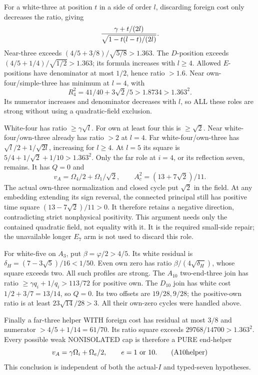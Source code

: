 \documentclass[11pt]{article}
\begin{document}
For a white-three at position \(t\) in a
side of order \(l\), discarding foreign
cost only decreases the ratio, giving
\[
                  {\gamma+t/(2l)\over
                            \sqrt{1-t(l-t)/(2l)}} .
\]
Near-three exceeds
\((4/5+3/8)/\sqrt{5/8}>1.363\).
The \(D\)-position exceeds
\((4/5+1/4)/\sqrt{1/2}>1.363\);
its formula increases with \(l\ge4\).
Allowed \(E\)-positions have denominator
at most \(1/2\), hence ratio \(>1.6\).
Near own-four/simple-three has minimum
at \(l=4\), with
\[
                     R_4^2=41/40+3\sqrt2/5
                             >1.8734>1.363^2 .
\]
Its numerator increases and denominator
decreases with \(l\), so ALL these roles
are strong without using a quadratic-field
exclusion.

White-four has ratio \(\ge\gamma\sqrt l\).
For own at least four this is \(\ge\sqrt2\).
Near white-four/own-three already has
ratio \(>2\) at \(l=4\).
Far white-four/own-three has
\(\sqrt l/2+1/\sqrt{2l}\), increasing for
\(l\ge4\).
At \(l=5\) its square is
\(5/4+1/\sqrt2+1/10>1.363^2\).
Only the far role at \(i=4\), or its
reflection seven, remains.
It has \(Q=0\) and
\[
 v_A=\Omega_4/2+\Omega_1/\sqrt2,\qquad
                   A_c^2=(13+7\sqrt2)/11 .
\]
The actual own-three normalization and
closed cycle put \(\sqrt2\) in the field.
At any embedding extending its sign reversal,
the connected principal still has positive
time square \((13-7\sqrt2)/11>0\).
It therefore retains a negative direction,
contradicting strict nonphysical positivity.
This argument needs only the contained
quadratic field, not equality with it.
It is the required small-side repair;
the unavailable longer \(E_7\) arm is not
used to discard this role.

For white-five on \(A_3\), put
\(\beta=\varphi/2>4/5\).
Its white residual is
\(\delta_H=(7-3\sqrt5)/16<1/50\).
Even own zero has ratio
\(\beta/(4\sqrt{\delta_H})\), whose square
exceeds two.  All such profiles are strong.
The \(A_{10}\) two-end-three join has ratio
\(\ge\gamma q_i+1/q_i>113/72\) for
positive own.
The \(D_{10}\) join has white cost
\(1/2+3/7=13/14\), so \(Q=0\).
Its two offsets are \(19/28,9/28\);
the positive-own ratio is at least
\(23\sqrt{14}/28>3\).
All their own-zero cycles were handled above.

Finally a far-three helper WITH foreign cost
has residual at most \(3/8\) and numerator
\(>4/5+1/14=61/70\).
Its ratio square exceeds
\(29768/14700>1.363^2\).
Every possible weak NONISOLATED cap is
therefore a PURE end-helper
\[
              v_A=\gamma\Omega_i+\Omega_e/2,
               \qquad e=1\ \hbox{or }10 .
\tag{A10helper}\label{eq:arithA10helper}
\]
This conclusion is independent of both
the actual-\(I\) and typed-seven hypotheses.
\end{document}
